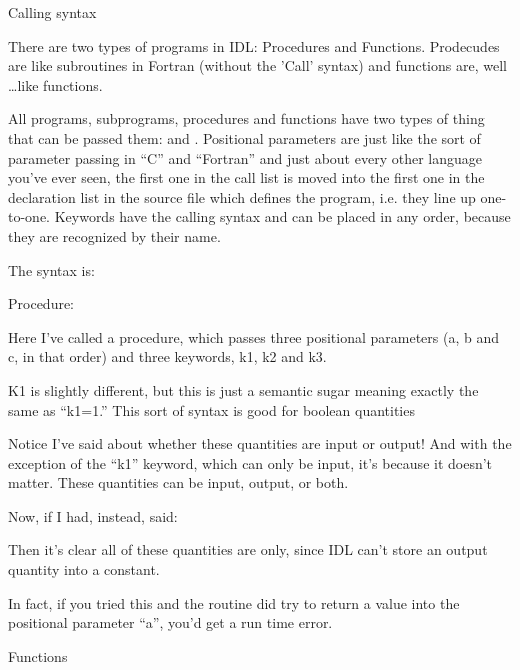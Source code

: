 \documentclass{article}
\begin{document}
       \ei
  \ei

  \item Calling syntax
  
   There are two types of programs in IDL: Procedures and
  Functions. Prodecudes are like subroutines in Fortran (without the
  'Call' syntax) and functions are, well  \ldots like functions.

   All programs, subprograms, procedures and functions have two types
  of thing that can be passed them:  and
  . Positional parameters are just like the sort of
  parameter passing in ``C'' and ``Fortran'' and just about every
  other language you've ever seen, the first one in the call list is
  moved into the first one in the declaration list in the source file
  which defines the program, i.e. they line up one-to-one. Keywords
  have the calling syntax  and can be placed in
  any order, because they are recognized by their name.

   The syntax is:

  \bi

   \item Procedure:


    Here I've called a procedure, which passes three positional
    parameters (a, b and c, in that order) and three keywords, k1, k2
    and k3.
  
    K1 is slightly different, but this is just a semantic sugar meaning
    exactly the same as ``k1=1.''  This sort of syntax is good for
    boolean quantities

    Notice I've said  about whether these
    quantities are input or output! And with the exception of the ``k1''
    keyword, which can only be input, it's because it doesn't
    matter. These quantities can be input, output, or both.

     Now, if I had, instead, said:


    Then it's clear all of these quantities are  only, since
    IDL can't store an output quantity into a constant.

    In fact, if you tried this and the routine did try to return a value
    into the positional parameter ``a'', you'd get a run time error.

  \item Functions 
  
\end{document}

